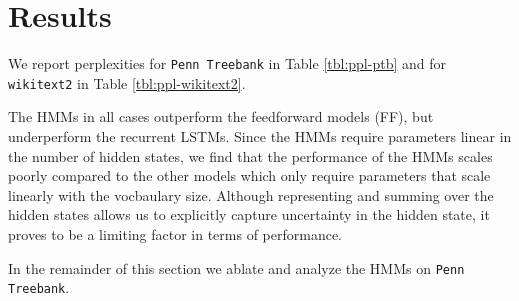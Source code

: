 \documentclass[11pt,a4paper]{article}
\begin{document}
\begin{comment}
\paragraph{Implementation}
We train two-layer LSTM recurrent neural networks with 256 units,
as well as two-layer feed-forward neural networks with 256 units.
The HMMs we train follow the sparsity constraints outlined in the previous
section with a dropout rate of 0.5,
and we vary the total number of states as well as states per word.
We optimize all models with AdamW \citep{adamw}.

We experimented with a couple batching strategies:
On \texttt{Penn Treebank},
the first strategy discarded the inter-sentence dependencies and shuffled all sentences,
and the second treated the corpus as a single flat document without shuffling.
On \texttt{Wikitext2}, we either shuffled at the document level or treated the corpus as a
single document.
Prior work on both corpuses treated the corpora as single documents.

See Appendix \ref{sec:hyperparams} for the hyperparameters for all models.
\end{comment}

\section{Results}
We report perplexities 
for \texttt{Penn Treebank} in Table \ref{tbl:ppl-ptb} and for 
\texttt{wikitext2} in Table \ref{tbl:ppl-wikitext2}.

The HMMs in all cases outperform the feedforward models (FF),
but underperform the recurrent LSTMs.
Since the HMMs require parameters linear in the number of hidden states,
we find that the performance of the HMMs scales poorly compared to the other models
which only require parameters that scale linearly with the vocbaulary size.
Although representing and summing over the hidden states
allows us to explicitly capture uncertainty in the hidden state,
it proves to be a limiting factor in terms of performance.

In the remainder of this section we ablate and analyze the HMMs on \texttt{Penn Treebank}.

\end{document}

